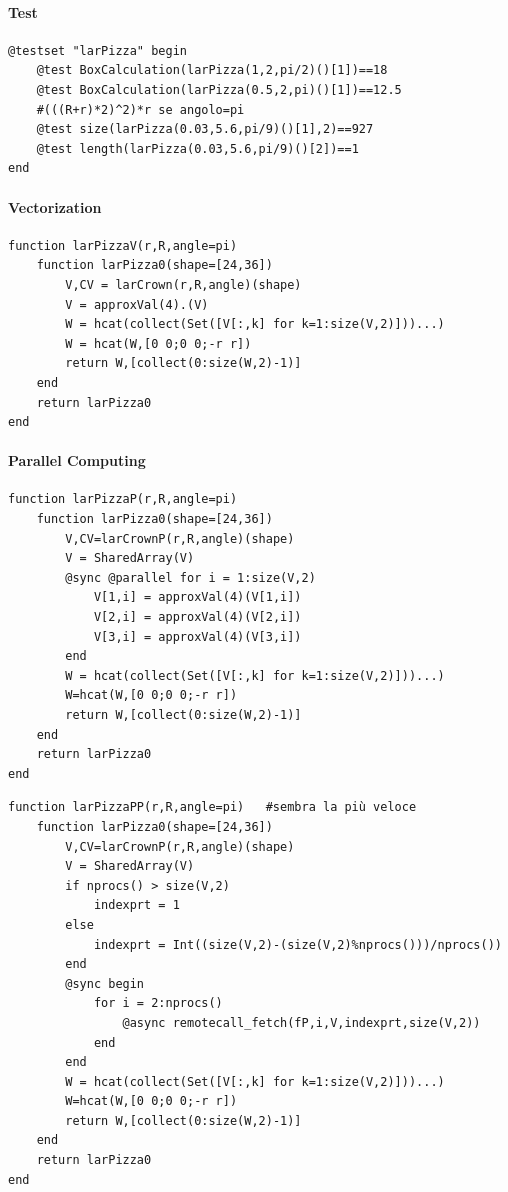 \documentclass{article}
\begin{document}
\paragraph{Test}
\begin{Verbatim}
@testset "larPizza" begin
	@test BoxCalculation(larPizza(1,2,pi/2)()[1])==18
	@test BoxCalculation(larPizza(0.5,2,pi)()[1])==12.5
	#(((R+r)*2)^2)*r se angolo=pi
	@test size(larPizza(0.03,5.6,pi/9)()[1],2)==927
	@test length(larPizza(0.03,5.6,pi/9)()[2])==1
end
\end{Verbatim}

\paragraph{Vectorization\\}
\begin{Verbatim}
function larPizzaV(r,R,angle=pi)
    function larPizza0(shape=[24,36])
        V,CV = larCrown(r,R,angle)(shape)
        V = approxVal(4).(V)
        W = hcat(collect(Set([V[:,k] for k=1:size(V,2)]))...)
        W = hcat(W,[0 0;0 0;-r r])
        return W,[collect(0:size(W,2)-1)]
    end
    return larPizza0
end
\end{Verbatim}

\paragraph{Parallel Computing\\}

\begin{Verbatim}
function larPizzaP(r,R,angle=pi)
    function larPizza0(shape=[24,36])
        V,CV=larCrownP(r,R,angle)(shape)
        V = SharedArray(V)
        @sync @parallel for i = 1:size(V,2)
            V[1,i] = approxVal(4)(V[1,i])
            V[2,i] = approxVal(4)(V[2,i])
            V[3,i] = approxVal(4)(V[3,i])
        end
        W = hcat(collect(Set([V[:,k] for k=1:size(V,2)]))...)
        W=hcat(W,[0 0;0 0;-r r])
        return W,[collect(0:size(W,2)-1)]
    end
    return larPizza0
end
\end{Verbatim}

\begin{Verbatim}
function larPizzaPP(r,R,angle=pi)   #sembra la più veloce
    function larPizza0(shape=[24,36])
        V,CV=larCrownP(r,R,angle)(shape)
        V = SharedArray(V)
        if nprocs() > size(V,2)
            indexprt = 1
        else
            indexprt = Int((size(V,2)-(size(V,2)%nprocs()))/nprocs())
        end
        @sync begin
            for i = 2:nprocs()
                @async remotecall_fetch(fP,i,V,indexprt,size(V,2))
            end
        end
        W = hcat(collect(Set([V[:,k] for k=1:size(V,2)]))...)
        W=hcat(W,[0 0;0 0;-r r])
        return W,[collect(0:size(W,2)-1)]
    end
    return larPizza0
end
\end{Verbatim}
\end{document}
